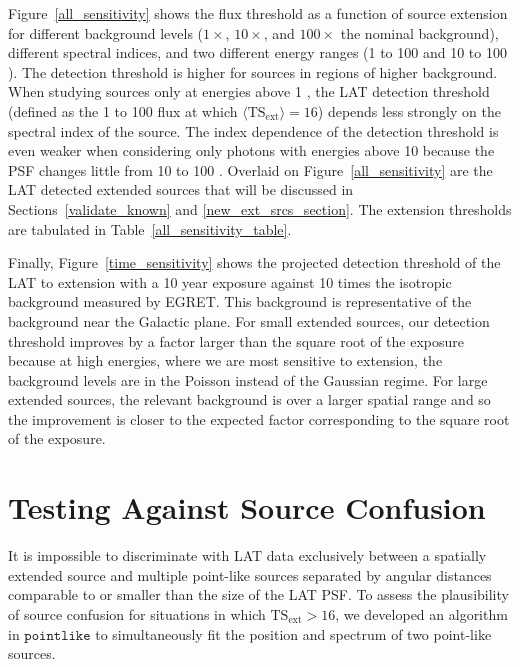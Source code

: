 \documentclass[12pt,preprint]{aastex}
\newcommand{\gev}{\text{GeV}\xspace}
\newcommand{\tsext}{{\ensuremath{\text{TS}_{\text{ext}}}}\xspace}
\newcommand{\pointlike}{\ensuremath{\mathtt{pointlike}}\xspace}
\begin{document}
Figure~\ref{all_sensitivity} shows the flux threshold as a function of
source extension for different background levels ($1\times$, $10\times$,
and $100\times$ the nominal background), different spectral indices,
and two different energy ranges (1 \gev to 100 \gev and 10 \gev to
100 \gev).  The detection threshold is higher for sources in regions of
higher background.  When studying sources only at energies above 1 \gev,
the LAT detection threshold (defined as the 1 \gev to 100 \gev flux at
which $\langle\tsext\rangle=16$) depends less strongly on the 
spectral index of the source. 
The index dependence of the detection threshold is
even weaker when considering only photons with energies above 10 \gev
because the PSF changes little from 10 \gev to 100 \gev.
Overlaid on Figure~\ref{all_sensitivity} are the LAT detected extended
sources that will be discussed in Sections~\ref{validate_known} and
\ref{new_ext_srcs_section}.  The extension thresholds are tabulated in
Table~\ref{all_sensitivity_table}.

Finally, Figure~\ref{time_sensitivity} shows the projected
detection threshold of the LAT to extension with a 10 year
exposure against 10 times
the isotropic background measured by EGRET. This background is representative of the
background near the Galactic plane.  For small extended sources, our
detection threshold improves by a factor larger than the square root
of the exposure because at high energies, where we are most sensitive
to extension, the background levels are in the Poisson instead of the
Gaussian regime.  For large extended sources, the relevant background
is over a larger spatial range and so the improvement is closer to the
expected factor corresponding to the square root of the exposure.


\section{Testing Against Source Confusion}
\label{dual_localization_method}

It is impossible to discriminate with LAT data exclusively between a
spatially extended source and multiple point-like sources separated by
angular distances comparable to or smaller than the size of the LAT PSF.
To assess the plausibility of source confusion for situations
in which $\tsext>16$, we developed an algorithm in \pointlike to
simultaneously fit the position and spectrum of two point-like sources.
\end{document}
